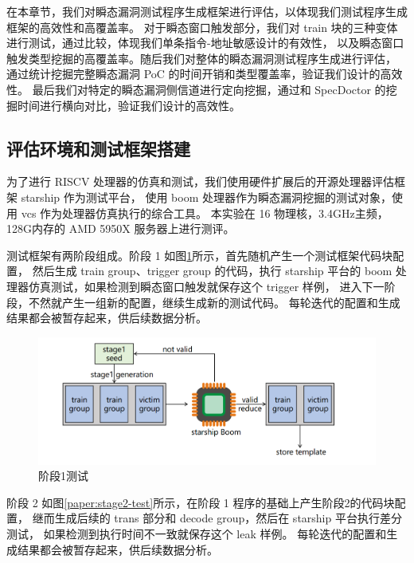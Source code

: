 在本章节，我们对瞬态漏洞测试程序生成框架进行评估，以体现我们测试程序生成框架的高效性和高覆盖率。
对于瞬态窗口触发部分，我们对 train 块的三种变体进行测试，通过比较，体现我们单条指令-地址敏感设计的有效性，
以及瞬态窗口触发类型挖掘的高覆盖率。随后我们对整体的瞬态漏洞测试程序生成进行评估，
通过统计挖掘完整瞬态漏洞 PoC 的时间开销和类型覆盖率，验证我们设计的高效性。
最后我们对特定的瞬态漏洞侧信道进行定向挖掘，通过和 SpecDoctor 的挖掘时间进行横向对比，验证我们设计的高效性。\par

\subsection{评估环境和测试框架搭建}

为了进行 RISCV 处理器的仿真和测试，我们使用硬件扩展后的开源处理器评估框架 starship 作为测试平台，
使用 boom 处理器作为瞬态漏洞挖掘的测试对象，使用 vcs 作为处理器仿真执行的综合工具。
本实验在 16 物理核，3.4GHz主频，128G内存的 AMD 5950X 服务器上进行测评。\par

测试框架有两阶段组成。阶段 1 如图\ref{paper:stage1-test}所示，首先随机产生一个测试框架代码块配置，
然后生成 train group、trigger group 的代码，执行 starship 平台的
boom 处理器仿真测试，如果检测到瞬态窗口触发就保存这个 trigger 样例，
进入下一阶段，不然就产生一组新的配置，继续生成新的测试代码。
每轮迭代的配置和生成结果都会被暂存起来，供后续数据分析。\par

\begin{figure}[!h]
    \centering
    \includegraphics[width=\linewidth]{figure/paper/stage1-test.png}
    \caption{阶段1测试}
    \label{paper:stage1-test}
\end{figure}

阶段 2 如图\ref{paper:stage2-test}所示，在阶段 1 程序的基础上产生阶段2的代码块配置，
继而生成后续的 trans 部分和 decode group，然后在 starship 平台执行差分测试，
如果检测到执行时间不一致就保存这个 leak 样例。
每轮迭代的配置和生成结果都会被暂存起来，供后续数据分析。\par

